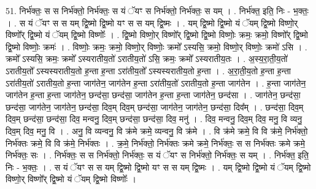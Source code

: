 \documentclass[17pt]{extarticle}
\begin{document}
51. निर्भ॑क्तः॒ स स निर्भ॑क्तो॒ निर्भ॑क्तः॒ स यं ॅयꣳ स निर्भ॑क्तो॒ निर्भ॑क्तः॒ स यम् । . निर्भ॑क्त॒ इति॒ निः - भ॒क्तः॒ । . स यं ॅयꣳ स स यम् द्वि॒ष्मो द्वि॒ष्मो यꣳ स स यम् द्वि॒ष्मः । . यम् द्वि॒ष्मो द्वि॒ष्मो यं ॅयम् द्वि॒ष्मो विष्णो॒र् विष्णो᳚र् द्वि॒ष्मो यं ॅयम् द्वि॒ष्मो विष्णोः᳚ । . द्वि॒ष्मो विष्णो॒र् विष्णो᳚र् द्वि॒ष्मो द्वि॒ष्मो विष्णोः॒ क्रमः॒ क्रमो॒ विष्णो᳚र् द्वि॒ष्मो द्वि॒ष्मो विष्णोः॒ क्रमः॑ । . विष्णोः॒ क्रमः॒ क्रमो॒ विष्णो॒र् विष्णोः॒ क्रमो᳚ ऽस्यसि॒ क्रमो॒ विष्णो॒र् विष्णोः॒ क्रमो॑ ऽसि । . क्रमो᳚ ऽस्यसि॒ क्रमः॒ क्रमो᳚ ऽस्यरातीय॒तो॑ ऽरातीय॒तो॑ ऽसि॒ क्रमः॒ क्रमो᳚ ऽस्यरातीय॒तः । . अ॒स्य॒रा॒ती॒य॒तो॑ ऽरातीय॒तो᳚ ऽस्यस्यरातीय॒तो ह॒न्ता ह॒न्ता ऽरा॑तीय॒तो᳚ ऽस्यस्यरातीय॒तो ह॒न्ता । . अ॒रा॒ती॒य॒तो ह॒न्ता ह॒न्ता ऽरा॑तीय॒तो॑ ऽरातीय॒तो ह॒न्ता जाग॑तेन॒ जाग॑तेन ह॒न्ता ऽरा॑तीय॒तो॑ ऽरातीय॒तो ह॒न्ता जाग॑तेन । . ह॒न्ता जाग॑तेन॒ जाग॑तेन ह॒न्ता ह॒न्ता जाग॑तेन॒ छन्द॑सा॒ छन्द॑सा॒ जाग॑तेन ह॒न्ता ह॒न्ता जाग॑तेन॒ छन्द॑सा । . जाग॑तेन॒ छन्द॑सा॒ छन्द॑सा॒ जाग॑तेन॒ जाग॑तेन॒ छन्द॑सा॒ दिव॒म् दिव॒म् छन्द॑सा॒ जाग॑तेन॒ जाग॑तेन॒ छन्द॑सा॒ दिव᳚म् । . छन्द॑सा॒ दिव॒म् दिव॒म् छन्द॑सा॒ छन्द॑सा॒ दिव॒ मन्वनु॒ दिव॒म् छन्द॑सा॒ छन्द॑सा॒ दिव॒ मनु॑ । . दिव॒ मन्वनु॒ दिव॒म् दिव॒ मनु॒ वि व्यनु॒ दिव॒म् दिव॒ मनु॒ वि । . अनु॒ वि व्यन्वनु॒ वि क्र॑मे क्रमे॒ व्यन्वनु॒ वि क्र॑मे । . वि क्र॑मे क्रमे॒ वि वि क्र॑मे॒ निर्भ॑क्तो॒ निर्भ॑क्तः क्रमे॒ वि वि क्र॑मे॒ निर्भ॑क्तः । . क्र॒मे॒ निर्भ॑क्तो॒ निर्भ॑क्तः क्रमे क्रमे॒ निर्भ॑क्तः॒ स स निर्भ॑क्तः क्रमे क्रमे॒ निर्भ॑क्तः॒ सः । . निर्भ॑क्तः॒ स स निर्भ॑क्तो॒ निर्भ॑क्तः॒ स यं ॅयꣳ स निर्भ॑क्तो॒ निर्भ॑क्तः॒ स यम् । . निर्भ॑क्त॒ इति॒ निः - भ॒क्तः॒ । . स यं ॅयꣳ स स यम् द्वि॒ष्मो द्वि॒ष्मो यꣳ स स यम् द्वि॒ष्मः । . यम् द्वि॒ष्मो द्वि॒ष्मो यं ॅयम् द्वि॒ष्मो विष्णो॒र् विष्णो᳚र् द्वि॒ष्मो यं ॅयम् द्वि॒ष्मो विष्णोः᳚ । \newline
\end{document}
